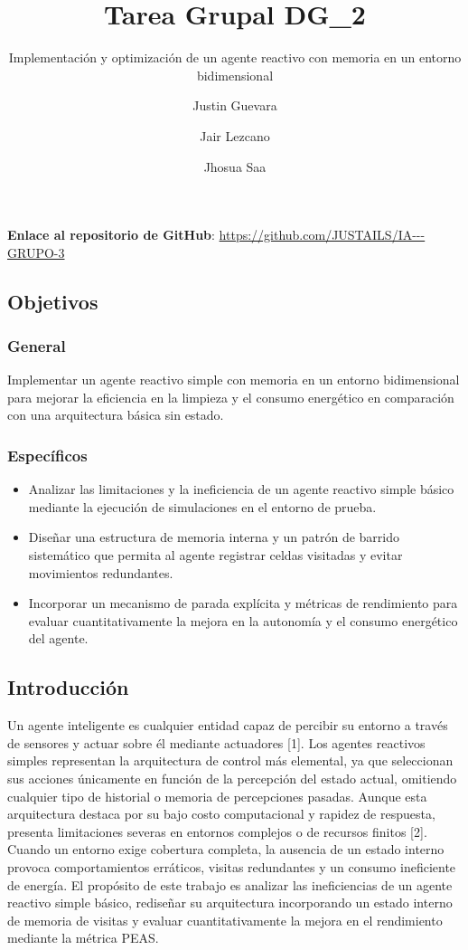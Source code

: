 \documentclass[
  spanish,
  spanish,
  es-tabla,
  twocolumn]{llncs}
\institute{Escuela Politécnica Nacional --- Facultad de Ingeniería de Sistemas}
\title{Tarea Grupal DG\_2}
\subtitle{Implementación y optimización de un agente reactivo con
memoria en un entorno bidimensional}
\author{Justin Guevara \and Jair Lezcano \and Jhosua Saa}
\date{}
\providecommand{\tightlist}{%
  \setlength{\itemsep}{0pt}\setlength{\parskip}{0pt}}
\begin{document}
\maketitle


\textbf{Enlace al repositorio de GitHub}:
\url{https://github.com/JUSTAILS/IA---GRUPO-3}

\subsection{Objetivos}\label{objetivos}

\subsubsection{General}\label{general}

Implementar un agente reactivo simple con memoria en un entorno
bidimensional para mejorar la eficiencia en la limpieza y el consumo
energético en comparación con una arquitectura básica sin estado.

\subsubsection{Específicos}\label{especuxedficos}

\begin{itemize}
\tightlist
\item
  Analizar las limitaciones y la ineficiencia de un agente reactivo
  simple básico mediante la ejecución de simulaciones en el entorno de
  prueba.
\item
  Diseñar una estructura de memoria interna y un patrón de barrido
  sistemático que permita al agente registrar celdas visitadas y evitar
  movimientos redundantes.
\item
  Incorporar un mecanismo de parada explícita y métricas de rendimiento
  para evaluar cuantitativamente la mejora en la autonomía y el consumo
  energético del agente.
\end{itemize}

\subsection{Introducción}\label{introducciuxf3n}

Un agente inteligente es cualquier entidad capaz de percibir su entorno
a través de sensores y actuar sobre él mediante actuadores {[}1{]}. Los
agentes reactivos simples representan la arquitectura de control más
elemental, ya que seleccionan sus acciones únicamente en función de la
percepción del estado actual, omitiendo cualquier tipo de historial o
memoria de percepciones pasadas. Aunque esta arquitectura destaca por su
bajo costo computacional y rapidez de respuesta, presenta limitaciones
severas en entornos complejos o de recursos finitos {[}2{]}. Cuando un
entorno exige cobertura completa, la ausencia de un estado interno
provoca comportamientos erráticos, visitas redundantes y un consumo
ineficiente de energía. El propósito de este trabajo es analizar las
ineficiencias de un agente reactivo simple básico, rediseñar su
arquitectura incorporando un estado interno de memoria de visitas y
evaluar cuantitativamente la mejora en el rendimiento mediante la
métrica PEAS.
\end{document}
